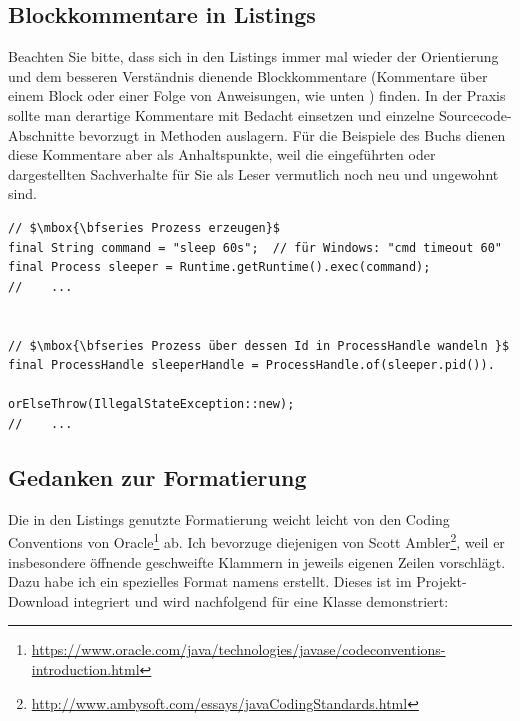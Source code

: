 \subsection{Blockkommentare in Listings}
Beachten Sie bitte, dass sich in den Listings immer mal wieder
der Orientierung und dem besseren Verständnis dienende Blockkommentare
(Kommentare über einem Block oder einer Folge von Anweisungen, wie unten
) finden.
In der Praxis sollte man derartige Kommentare mit Bedacht einsetzen und
 einzelne Sourcecode-Abschnitte bevorzugt in Methoden auslagern. Für die Beispiele
des Buchs dienen diese Kommentare aber als Anhaltspunkte, weil die
eingeführten oder dargestellten Sachverhalte für Sie als Leser vermutlich
noch neu und ungewohnt sind.
%
\lstset{mathescape=true}
\vspace{-0.85mm}
\begin{lstlisting}
// $\mbox{\bfseries Prozess erzeugen}$
final String command = "sleep 60s";  // für Windows: "cmd timeout 60"
final Process sleeper = Runtime.getRuntime().exec(command);
//    ...


// $\mbox{\bfseries Prozess über dessen Id in ProcessHandle wandeln }$
final ProcessHandle sleeperHandle = ProcessHandle.of(sleeper.pid()).
                                    orElseThrow(IllegalStateException::new);
//    ...
\end{lstlisting}
\vspace{-0.85mm}
\lstset{mathescape=false}






\subsection{Gedanken zur Formatierung}


Die in den Listings genutzte Formatierung weicht leicht von den Coding Conventions von
Oracle\footnote{\url{https://www.oracle.com/java/technologies/javase/codeconventions-introduction.html}} ab.
Ich bevorzuge diejenigen von Scott Ambler\footnote{\url{http://www.ambysoft.com/essays/javaCodingStandards.html}},
weil er insbesondere öffnende geschweifte Klammern in jeweils eigenen Zeilen vorschlägt.
Dazu habe ich ein spezielles Format namens  erstellt.
Dieses ist im Projekt-Download integriert und wird nachfolgend für eine Klasse demonstriert:


